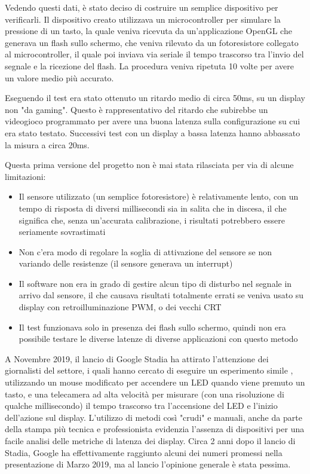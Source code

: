 Vedendo questi dati, è stato deciso di costruire un semplice dispositivo per verificarli. Il dispositivo creato utilizzava un microcontroller per simulare la pressione di un tasto, la quale veniva ricevuta da un'applicazione OpenGL che generava un flash sullo schermo, che veniva rilevato da un fotoresistore collegato al microcontroller, il quale poi inviava via seriale il tempo trascorso tra l'invio del segnale e la ricezione del flash. La procedura veniva ripetuta 10 volte per avere un valore medio più accurato.

Eseguendo il test era stato ottenuto un ritardo medio di circa 50ms\cite{fdossena1}, su un display non "da gaming". Questo è rappresentativo del ritardo che subirebbe un videogioco programmato per avere una buona latenza sulla configurazione su cui era stato testato. Successivi test con un display a bassa latenza hanno abbassato la misura a circa 20ms.

Questa prima versione del progetto non è mai stata rilasciata per via di alcune limitazioni:
\begin{itemize}
	\item Il sensore utilizzato (un semplice fotoresistore) è relativamente lento\cite{adafruit_photores}, con un tempo di risposta di diversi millisecondi sia in salita che in discesa, il che significa che, senza un'accurata calibrazione, i risultati potrebbero essere seriamente sovrastimati
	\item Non c'era modo di regolare la soglia di attivazione del sensore se non variando delle resistenze (il sensore generava un interrupt)
	\item Il software non era in grado di gestire alcun tipo di disturbo nel segnale in arrivo dal sensore, il che causava risultati totalmente errati se veniva usato su display con retroilluminazione PWM, o dei vecchi CRT
	\item Il test funzionava solo in presenza dei flash sullo schermo, quindi non era possibile testare le diverse latenze di diverse applicazioni con questo metodo
\end{itemize}

A Novembre 2019, il lancio di Google Stadia ha attirato l'attenzione dei giornalisti del settore, i quali hanno cercato di eseguire un esperimento simile\cite{gamersnexus_stadia} \cite{gamersnexus_stadia2}, utilizzando un mouse modificato per accendere un LED quando viene premuto un tasto, e una telecamera ad alta velocità per misurare (con una risoluzione di qualche millisecondo) il tempo trascorso tra l'accensione del LED e l'inizio dell'azione sul display. L'utilizzo di metodi così "crudi" e manuali, anche da parte della stampa più tecnica e professionista evidenzia l'assenza di dispositivi per una facile analisi delle metriche di latenza dei display. Circa 2 anni dopo il lancio di Stadia, Google ha effettivamente raggiunto alcuni dei numeri promessi nella presentazione di Marzo 2019, ma al lancio l'opinione generale è stata pessima.

